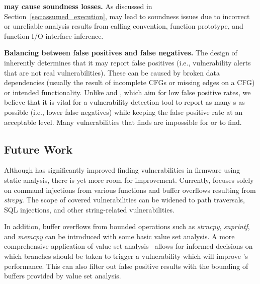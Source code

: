 \noindent
\textbf{\assumed may cause soundness losses.}
As discussed in Section~\ref{sec:assumed_execution}, \assumed may lead to soundness issues due to incorrect or unreliable analysis results from calling convention, function prototype, and function I/O interface inference.

\smallskip
\noindent
\textbf{Balancing between false positives and false negatives.}
The design of \mango inherently determines that it may report false positives (i.e., vulnerability alerts that are not real vulnerabilities).
These can be caused by broken data dependencies (usually the result of incomplete CFGs or missing edges on a CFG) or intended functionality.
Unlike \karonte and \satc, which aim for low false positive rates, we believe that it is vital for a vulnerability detection tool to report as many \trupoc{}s as possible (i.e., lower false negatives) while keeping the false positive rate at an acceptable level.
Many vulnerabilities that \mango finds are impossible for \karonte or \satc to find.

\subsection{Future Work}
Although \mango has significantly improved finding vulnerabilities in firmware using static analysis, there is yet more room for improvement.
Currently, \mango focuses solely on command injections from various functions and buffer overflows resulting from \textit{strcpy}.
The scope of covered vulnerabilities can be widened to path traversals, SQL injections, and other string-related vulnerabilities.

In addition, buffer overflows from bounded operations such as \textit{strncpy}, \textit{snprintf}, and \textit{memcpy} can be introduced with some basic value set analysis.
A more comprehensive application of value set analysis~\cite{balakrishnan2005codesurfer} allows for informed decisions on which branches should be taken to trigger a vulnerability which will improve \assumed's performance.
This can also filter out false positive results with the bounding of buffers provided by value set analysis.
